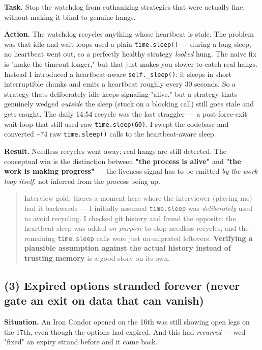 \documentclass[11pt]{article}
\begin{document}
\textbf{Task.} Stop the watchdog from euthanizing strategies that were actually fine, without making
it blind to genuine hangs.

\textbf{Action.} The watchdog recycles anything whose heartbeat is stale. The problem was that idle
and wait loops used a plain \texttt{time.sleep()} --- during a long sleep, no heartbeat went out, so a
perfectly healthy strategy \emph{looked} hung. The naive fix is "make the timeout longer," but that
just makes you slower to catch real hangs. Instead I introduced a heartbeat-aware
\texttt{self.\_sleep()}: it sleeps in short interruptible chunks and emits a heartbeat roughly every 30
seconds. So a strategy that\textquotesingle s deliberately idle keeps signaling "alive," but a strategy that\textquotesingle s
genuinely wedged \emph{outside} the sleep (stuck on a blocking call) still goes stale and gets caught.
The daily 14:54 recycle was the last straggler --- a post-force-exit wait loop that still used
raw \texttt{time.sleep(60)}. I swept the codebase and converted \textasciitilde74 raw \texttt{time.sleep()} calls to the
heartbeat-aware sleep.

\textbf{Result.} Needless recycles went away; real hangs are still detected. The conceptual win is
the distinction between \textbf{"the process is alive"} and \textbf{"the work is making progress"} --- the
liveness signal has to be emitted \emph{by the work loop itself}, not inferred from the process being
up.

\begin{quote}
Interview gold: there\textquotesingle s a moment here where the interviewer (playing me) had it backwards ---
I initially assumed \texttt{time.sleep} was \emph{deliberately} used to avoid recycling. I checked git
history and found the opposite: the heartbeat sleep was added \emph{on purpose} to stop needless
recycles, and the remaining \texttt{time.sleep} calls were just un-migrated leftovers. \textbf{Verifying a
plausible assumption against the actual history instead of trusting memory} is a good story
on its own.
\end{quote}

\subsection{(3) Expired options stranded forever (never gate an exit on data that can vanish)}\label{3-expired-options-stranded-forever-never-gate-an-exit-on-data-that-can-vanish}

\textbf{Situation.} An Iron Condor opened on the 16th was still showing open legs on the 17th, even
though the options had expired. And this had \emph{recurred} --- we\textquotesingle d "fixed" an expiry strand before
and it came back.
\end{document}
